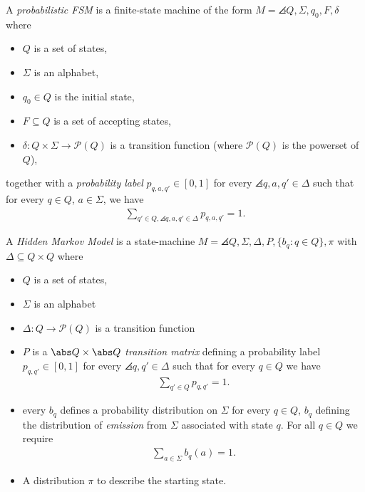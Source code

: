 \documentclass{article}
\begin{document}
\begin{definition}[L19]
	A \emph{probabilistic FSM} is a finite-state machine of the form
	$M=\angles{Q, \Sigma, q_0, F, \delta}$ where
	\begin{itemize}
		\item $Q$ is a set of states,
		\item $\Sigma$ is an alphabet,
		\item $q_0\in Q$ is the initial state,
		\item $F\subseteq Q$ is a set of accepting states,
		\item $\delta:Q\times \Sigma \to\mathcal{P}(Q)$ is a transition function
		      (where $\mathcal{P}(Q)$ is the powerset of $Q$),
	\end{itemize}
	together with a \emph{probability label} $p_{q,a,q'}\in[0,1]$ for every
	$\angles{q,a,q'}\in\Delta$ such that for every $q\in Q$, $a\in\Sigma$, we have
	\begin{align*}
		\sum_{q'\in Q, \angles{q,a,q'}\in\Delta} p_{q,a,q'}=1.
	\end{align*}
\end{definition}

\begin{definition}[L19]
	A \emph{Hidden Markov Model} is a state-machine $M=\angles{Q, \Sigma, \Delta, P,
			\{b_q:q\in Q\}, \pi}$ with $\Delta\subseteq Q\times Q$ where
	\begin{itemize}
		\item $Q$ is a set of states,
		\item $\Sigma$ is an alphabet
		\item $\Delta:Q\to\mathcal{P}(Q)$ is a transition function
		\item $P$ is a $\abs Q \times \abs Q$ \emph{transition matrix}
		      defining a probability label $p_{q,q'}\in[0,1]$ for every
		      $\angles{q,q'}\in\Delta$ such that for every $q\in Q$ we have
		      \begin{align*}
			      \sum_{q'\in Q}p_{q,q'} = 1.
		      \end{align*}
		\item every $b_q$ defines a probability distribution on $\Sigma$
		      for every $q\in Q$, $b_q$ defining the distribution of
		      \emph{emission} from $\Sigma$ associated with state $q$. For all
		      $q\in Q$ we require \begin{align*}
			      \sum_{a\in\Sigma} b_q(a) = 1.
		      \end{align*}
		\item A distribution $\pi$ to describe the starting state.
	\end{itemize}
\end{definition}
\end{document}
